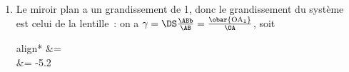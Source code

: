 \documentclass[../../main/main.tex]{subfiles}
\begin{document}
{\begin{enumerate}
		      d'intersection entre le miroir plan et l'axe optique de la lentille.
		      L'image finale A' donnée par le miroir plan est telle que
		      \[
			      \boxed{\obar{\rm HA'} = \obar{\rm HA_1} = D}
		      \]
		      On a donc pour la lentille
		      \begin{empheq}[box=\fbox]{align*}
			       &=  + 
			      \\\Lra
			       &= d+D
		      \end{empheq}
		      On utilise la relation de conjugaison des lentilles minces en nommant
		      $V$ la vergence de la lentille~:
		      \begin{equation*}
			      V = \frac{1}{d+D} - \frac{1}{-h}
			      \Lra
			      \boxed{h = \frac{d+D}{V(d+D)-d}}
			      \qav
			      \left\{
			      \begin{array}{rcl}
				      d & = & \SI{10e-2}{m}    \\
				      D & = & \SI{3.0}{m}      \\
				      V & = & \SI{2.0}{m^{-1}}
			      \end{array}
			      \right.
		      \end{equation*}
		      Et l'application numérique donne
		      \begin{equation*}
			      \xul{h = \SI{60}{cm}}
		      \end{equation*}
		\item Le miroir plan a un grandissement de 1, donc le grandissement du
		      système est celui de la lentille~: on a $\gamma = \DS
			      \frac{\ABb}{\AB} = \frac{\obar{\rm OA_1}}{\OA}$, soit
		      \begin{empheq}[box=\fbox]{align*}
			      \gamma &= \\
			      \gamma &= -5.2
		      \end{empheq}
	\end{enumerate}
}
\end{document}
